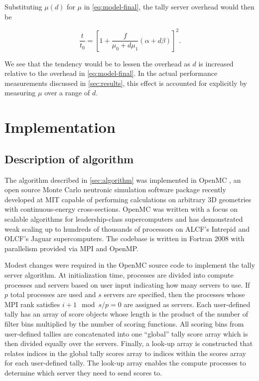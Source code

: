 \documentclass[3p]{elsarticle}
\begin{document}
\noindent Substituting $\mu(d)$ for $\mu$ in \eqref{eq:model-final}, the tally
server overhead would then be

\begin{equation}
  \label{eq:model-final-mud}
  \frac{t}{t_0} = \left [ 1 + \frac{f}{\mu_0 + d\mu_1} \left ( \alpha + d\beta
    \right ) \right ]^2.
\end{equation}

\noindent We see that the tendency would be to lessen the overhead as $d$ is
increased relative to the overhead in \eqref{eq:model-final}. In the actual
performance measurements discussed in \autoref{sec:results}, this effect is
accounted for explicitly by measuring $\mu$ over a range of $d$.

\section{Implementation}
\label{sec:implementation}

\subsection{Description of algorithm}

The algorithm described in \autoref{sec:algorithm} was implemented in OpenMC
\cite{ane-romano-2012}, an open source Monte Carlo neutronic simulation software
package recently developed at MIT capable of performing calculations on
arbitrary 3D geometries with continuous-energy cross-sections. OpenMC was
written with a focus on scalable algorithms for leadership-class supercomputers
and has demonstrated weak scaling up to hundreds of thousands of processors on
ALCF's Intrepid and OLCF's Jaguar supercomputers. The codebase is written in
Fortran 2008 with parallelism provided via MPI and OpenMP.

Modest changes were required in the OpenMC source code to implement the tally
server algorithm. At initialization time, processes are divided into compute
processes and servers based on user input indicating how many servers to use. If
$p$ total processes are used and $s$ servers are specified, then the processes
whose MPI rank satisfies $i + 1 \mod s/p = 0$ are assigned as servers. Each
user-defined tally has an array of score objects whose length is the product of
the number of filter bins multiplied by the number of scoring functions. All
scoring bins from user-defined tallies are concatenated into one ``global''
tally score array which is then divided equally over the servers. Finally, a
look-up array is constructed that relates indices in the global tally scores
array to indices within the scores array for each user-defined tally. The
look-up array enables the compute processes to determine which server they need
to send scores to.
\end{document}

